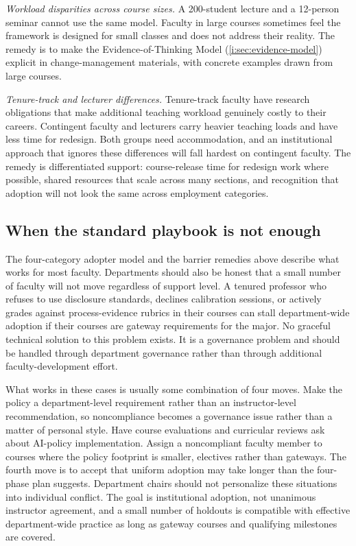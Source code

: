 \documentclass{SIAMbook2023}
\begin{document}
\textit{Workload disparities across course sizes.} A 200-student lecture and a 12-person seminar cannot use the same model. Faculty in large courses sometimes feel the framework is designed for small classes and does not address their reality. The remedy is to make the Evidence-of-Thinking Model (\cref{i:sec:evidence-model}) explicit in change-management materials, with concrete examples drawn from large courses.

\textit{Tenure-track and lecturer differences.} Tenure-track faculty have research obligations that make additional teaching workload genuinely costly to their careers. Contingent faculty and lecturers carry heavier teaching loads and have less time for redesign. Both groups need accommodation, and an institutional approach that ignores these differences will fall hardest on contingent faculty. The remedy is differentiated support: course-release time for redesign work where possible, shared resources that scale across many sections, and recognition that adoption will not look the same across employment categories.

\subsection{When the standard playbook is not enough}
\label{u:subsec:hard-cases}

The four-category adopter model and the barrier remedies above describe what works for most faculty. Departments should also be honest that a small number of faculty will not move regardless of support level. A tenured professor who refuses to use disclosure standards, declines calibration sessions, or actively grades against process-evidence rubrics in their courses can stall department-wide adoption if their courses are gateway requirements for the major. No graceful technical solution to this problem exists. It is a governance problem and should be handled through department governance rather than through additional faculty-development effort.

What works in these cases is usually some combination of four moves. Make the policy a department-level requirement rather than an instructor-level recommendation, so noncompliance becomes a governance issue rather than a matter of personal style. Have course evaluations and curricular reviews ask about AI-policy implementation. Assign a noncompliant faculty member to courses where the policy footprint is smaller, electives rather than gateways. The fourth move is to accept that uniform adoption may take longer than the four-phase plan suggests. Department chairs should not personalize these situations into individual conflict. The goal is institutional adoption, not unanimous instructor agreement, and a small number of holdouts is compatible with effective department-wide practice as long as gateway courses and qualifying milestones are covered.
\end{document}
